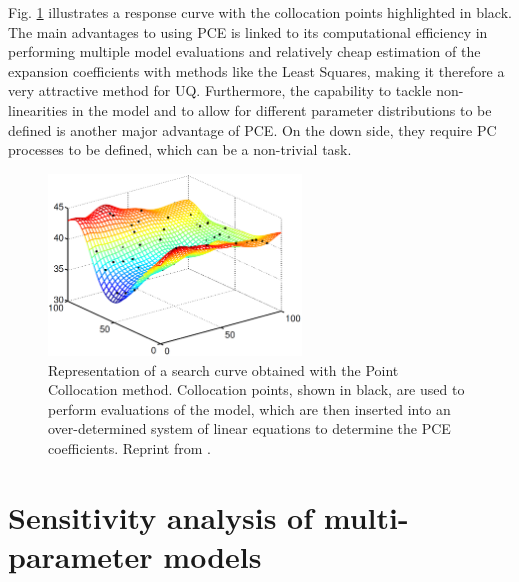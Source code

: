 \documentclass[12pt]{article}
\begin{document}
 \vspace{0.5cm}
Fig. \ref{fig:PCE} illustrates a response curve with the collocation points highlighted in black. The main advantages to using PCE is linked to its computational efficiency in performing multiple model evaluations and relatively cheap estimation of the expansion coefficients with methods like the Least Squares, making it therefore a very attractive method for UQ. 
Furthermore, the capability to tackle non-linearities in the model and to allow for different parameter distributions to be defined is another major advantage of PCE.  %
On the down side, they require PC processes to be defined, which can be a non-trivial task. 
  
  \begin{figure}[h]
  	\centering
  	\includegraphics[width=0.6\textwidth]{images/Search_curve.png}
  	\caption{Representation of a search curve obtained with the Point Collocation method. Collocation points, shown in black, are used to perform evaluations of the model, which are then inserted into an over-determined system of linear equations to determine the PCE coefficients. Reprint from \cite{PCEfigure}.}
  	\label{fig:PCE}
  \end{figure}
  	

\section{Sensitivity analysis of multi-parameter models}
\end{document}

